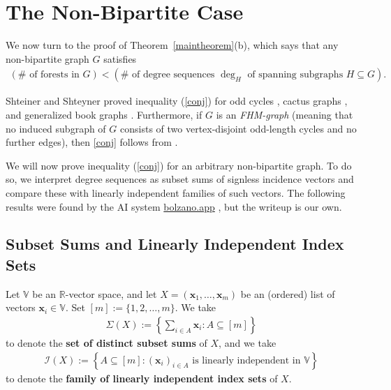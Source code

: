 \documentclass[12pt]{article}
\theoremstyle{definition}
\theoremstyle{remark}
\newcommand{\VV}{\mathbb{V}} %
\newcommand{\set}[1]{\left\{ #1 \right\}}
\newcommand{\tup}[1]{\left( #1 \right)}
\begin{document}
\section{\label{sec.nbp}The Non-Bipartite Case}

We now turn to the proof of Theorem~\ref{maintheorem}(b), which says that any non-bipartite graph $G$ satisfies \begin{align}\label{conj}
    (\# \text{ of forests in $G$}) <(\# \text{ of degree sequences $\deg_H$ of spanning subgraphs $H \subseteq G$}).
\end{align}

Shteiner and Shteyner proved inequality (\ref{conj}) for odd cycles \cite[Proposition~5.10]{shteiner2025comparingnumberssubforestssubgraphdegreetuples}, cactus graphs \cite[Theorem~5.22]{shteiner2025comparingnumberssubforestssubgraphdegreetuples}, and generalized book graphs \cite[Theorem~5.28]{shteiner2025comparingnumberssubforestssubgraphdegreetuples}. Furthermore, if $G$ is an \emph{FHM-graph} (meaning that no induced subgraph of $G$ consists of two vertex-disjoint odd-length cycles and no further edges), then \eqref{conj} follows from \cite[Theorem 5.3 and Theorem 5.1]{Stanley1991}.

We will now prove inequality (\ref{conj}) for an arbitrary non-bipartite graph. To do so, we interpret degree sequences as subset sums of signless incidence vectors and compare these with linearly independent families of such vectors.
The following results were found by the AI system \url{bolzano.app} \cite{Bolzano26}, but the writeup is our own.

\subsection{\label{subsec.vecs}Subset Sums and Linearly Independent Index Sets}

Let $\VV$ be an $\mathbb{R}$-vector space, and let $X = \tup{\mathbf{x}_1,\ldots,\mathbf{x}_m}$ be an (ordered) list of vectors $\mathbf{x}_i \in \VV$.
Set $[m] := \{1,2,\ldots,m\}$. We take \begin{align*}
    \Sigma(X) := \set{\sum_{i \in A}\mathbf{x}_i : A \subseteq [m]}
\end{align*} to denote the \textbf{set of distinct subset sums} of $X$, and we take \begin{align*}
    \mathcal{I}(X) := \set{A \subseteq [m] : \tup{\mathbf{x}_i}_{i \in A} \text{ is linearly independent in } \VV} 
\end{align*} to denote the \textbf{family of linearly independent index sets} of $X$.
\end{document}
